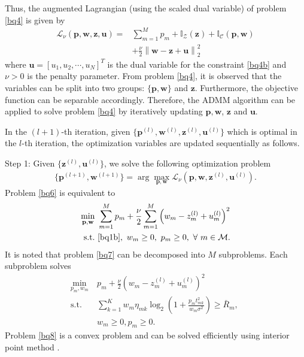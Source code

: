 \documentclass[journal]{IEEEtran}
\begin{document}
Thus, the augmented Lagrangian (using the scaled dual variable) of problem \eqref{bq4} is given by
\begin{align}
\mathcal{L}_\nu\left(\mathbf{p},\mathbf{w}, \mathbf{z},\mathbf{u}\right)=& \sum\limits_{m=1}^{M} p_m + \mathbb{I}_\mathcal{Z}\left(\mathbf{z}\right) + \mathbb{I}_\mathcal{C}\left(\mathbf{p},\mathbf{w}\right)\nonumber \\ & +\frac{\nu}{2}\left\|\mathbf{w} - \mathbf{z} + \mathbf{u}\right\|_2^2
\end{align}
where $\mathbf{u} = [u_1, u_2, \cdots, u_N]^T$ is the dual variable for the  constraint \eqref{bq4b} and $\nu>0$ is the penalty parameter. From problem \eqref{bq4}, it is observed that the variables can be split into two groups: $\{\mathbf{p}, \mathbf{w}\}$ and $\mathbf{z}$. Furthermore, the objective function can be separable accordingly. Therefore, the ADMM algorithm can be applied to solve problem \eqref{bq4} by iteratively updating $\mathbf{p}, \mathbf{w}$, $\mathbf{z}$ and $\mathbf{u}$.

In the $(l+1)$-th iteration, given $\{\mathbf{p}^{(l)}, \mathbf{w}^{(l)}, \mathbf{z}^{(l)}, \mathbf{u}^{(l)}\}$ which is optimal in the $l$-th iteration, the optimization variables are updated sequentially as follows.

Step 1: Given $\{\mathbf{z}^{(l)}, \mathbf{u}^{(l)}\}$, we solve the following optimization problem
\begin{align}\label{bq6}
\{\mathbf{p}^{(l+1)}, \mathbf{w}^{(l+1)}\} = \arg \max_{\mathbf{p}, \mathbf{w}} \mathcal{L}_\nu\left(\mathbf{p}, \mathbf{w}, \mathbf{z}^{(l)}, \mathbf{u}^{(l)}\right).
\end{align}
Problem \eqref{bq6} is equivalent to
\begin{align}\label{bq7}
\min_{\mathbf{p}, \mathbf{w}}\ & \sum\limits_{m=1}^{M} p_m + \frac{\nu}{2}\sum\limits_{m=1}^{M}\left(w_m-z_m^{(l)}+u_m^{(l)}\right)^2 \nonumber\\ \mbox{s.t.}\ &  \eqref{bq1b},\ w_m\geq 0,\ p_m\geq 0,\ \forall\ m\in\mathcal{M}.
\end{align}
It is noted that problem \eqref{bq7} can be decomposed into $M$ subproblems. Each subproblem solves
\begin{align}\label{bq8}
\min_{p_m, w_m}\ & p_m+\frac{\nu}{2}\left(w_m-z_m^{(l)}+u_m^{(l)}\right)^2 \nonumber\\
\mbox{s.t.} \ & \sum\limits_{k= 1}^{K}w_m \eta_{mk}\log_2\left(1 + \frac{p_mt_{mk}^2}{w_m\sigma^2}\right)\geq \bar{R}_m,\ \nonumber\\
& w_m\geq 0, p_m\geq 0.
\end{align}
Problem \eqref{bq8} is a convex problem and can be solved efficiently using interior point method \cite{SBoyd1}.
\end{document}
